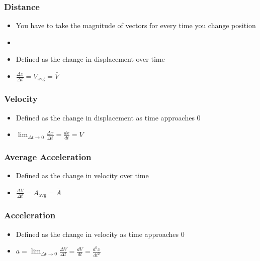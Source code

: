 \documentclass[
  letterpaper,
  DIV=11,
  numbers=noendperiod]{scrartcl}
\providecommand{\tightlist}{%
  \setlength{\itemsep}{0pt}\setlength{\parskip}{0pt}}\usepackage{longtable,booktabs,array}
\begin{document}
\hypertarget{distance}{%
\subsubsection{Distance}\label{distance}}

\begin{itemize}
\tightlist
\item
  You have to take the magnitude of vectors for every time you change
  position
\item
\item
  Defined as the change in displacement over time
\item
  \(\frac{\Delta x}{\Delta t} = V_\text{avg} = \bar{V}\)
\end{itemize}

\hypertarget{velocity}{%
\subsubsection{Velocity}\label{velocity}}

\begin{itemize}
\tightlist
\item
  Defined as the change in displacement as time approaches 0
\item
  \(\lim_{\Delta t \to 0} \frac{\Delta x}{\Delta t} = \frac{dx}{dt} = V\)
\end{itemize}

\hypertarget{average-acceleration}{%
\subsubsection{Average Acceleration}\label{average-acceleration}}

\begin{itemize}
\tightlist
\item
  Defined as the change in velocity over time
\item
  \(\frac{\Delta V}{\Delta t} = A_\text{avg} = \bar{A}\)
\end{itemize}

\hypertarget{acceleration}{%
\subsubsection{Acceleration}\label{acceleration}}

\begin{itemize}
\tightlist
\item
  Defined as the change in velocity as time approaches 0
\item
  \(a = \lim_{\Delta t \to 0} \frac{\Delta V}{\Delta t} = \frac{dV}{dt} = \frac{d^2x}{dt^2}\)
\end{itemize}
\end{document}

